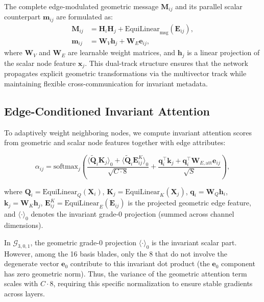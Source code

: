 \documentclass[10pt]{article}
\begin{document}
The complete edge-modulated geometric message $\mathbf{M}_{ij}$ and its parallel scalar counterpart $\mathbf{m}_{ij}$ are formulated as:
\begin{align}
    \mathbf{M}_{ij} &= \mathbf{H}_i \mathbf{H}_j + \mathrm{EquiLinear}_{\text{msg}}(\mathbf{E}_{ij}), \label{eq:msg_geom} \\
    \mathbf{m}_{ij} &= \mathbf{W}_V \mathbf{h}_j + \mathbf{W}_E \mathbf{e}_{ij},
\end{align}
where $\mathbf{W}_V$ and $\mathbf{W}_E$ are learnable weight matrices, and $\mathbf{h}_j$ is a linear projection of the scalar node feature $\mathbf{x}_j$. This dual-track structure ensures that the network propagates explicit geometric transformations via the multivector track while maintaining flexible cross-communication for invariant metadata.

\subsection{Edge-Conditioned Invariant Attention}
\label{subsec:attention}

\noindent
To adaptively weight neighboring nodes, we compute invariant attention scores from geometric and scalar node features together with edge attributes:

\begin{equation}
    \alpha_{ij}
    =
    \mathrm{softmax}_j
    \left(
    \frac{
        \langle \widetilde{\mathbf{Q}}_i \mathbf{K}_j \rangle_0
        +
        \langle \widetilde{\mathbf{Q}}_i \mathbf{E}_{ij}^{K} \rangle_0
    }
    {\sqrt{C\cdot 8}}
    +
    \frac{
        \mathbf{q}_i^{\top}\mathbf{k}_j
        +
        \mathbf{q}_i^{\top}\mathbf{W}_{E,\mathrm{att}}\mathbf{e}_{ij}
    }
    {\sqrt{S}}
    \right),
    \label{eq:attention}
\end{equation}

\noindent
where $\mathbf{Q}_i=\mathrm{EquiLinear}_Q(\mathbf{X}_i)$, $\mathbf{K}_j=\mathrm{EquiLinear}_K(\mathbf{X}_j)$, $\mathbf{q}_i=\mathbf{W}_Q\mathbf{h}_i$, $\mathbf{k}_j=\mathbf{W}_K\mathbf{h}_j$, $\mathbf{E}_{ij}^{K}=\mathrm{EquiLinear}_E(\mathbf{E}_{ij})$ is the projected geometric edge feature, and $\langle\cdot\rangle_0$ denotes the invariant grade-0 projection (summed across channel dimensions).

\noindent
In $\mathcal{G}_{3,0,1}$, the geometric grade-0 projection $\langle \cdot \rangle_0$ is the invariant scalar part. 
However, among the 16 basis blades, only the 8 that do not involve the degenerate vector $\mathbf{e}_0$ contribute to this invariant dot product (the $\mathbf{e}_0$ component has zero geometric norm). 
Thus, the variance of the geometric attention term scales with $C \cdot 8$, requiring this specific normalization to ensure stable gradients across layers.
\end{document}
